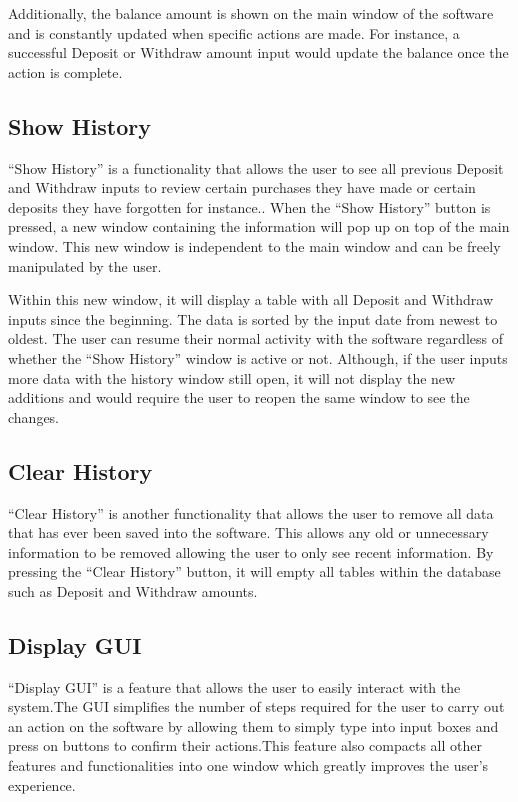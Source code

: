 \documentclass[12pt]{article}
\begin{document}
Additionally, the balance amount is shown on the main window of the software and is constantly updated when specific actions are made. For instance, a successful Deposit or Withdraw amount input would update the balance once the action is complete. 


\subsection{Show History} 
“Show History” is a functionality that allows the user to see all previous Deposit and Withdraw inputs to review certain purchases they have made or certain deposits they have forgotten for instance.. When the “Show History” button is pressed, a new window containing the information will pop up on top of the main window. This new window is independent to the main window and can be freely manipulated by the user. 

Within this new window, it will display a table with all Deposit and Withdraw inputs since the beginning. The data is sorted by the input date from newest to oldest. The user can resume their normal activity with the software regardless of whether the “Show History” window is active or not. Although, if the user inputs more data with the history window still open, it will not display the new additions and would require the user to reopen the same window to see the changes.


\subsection{Clear History}
“Clear History” is another functionality that allows the user to remove all data that has ever been saved into the software. This allows any old or unnecessary information to be removed allowing the user to only see recent information. By pressing the “Clear History” button, it will empty all tables within the database such as Deposit and Withdraw amounts.

\subsection{Display GUI}
“Display GUI” is a feature that allows the user to easily interact with the system.The GUI simplifies the number of steps required for the user to carry out an action on the software by allowing them to simply type into input boxes and press on buttons to confirm their actions.This feature also compacts all other features and functionalities into one window which greatly improves the user’s experience. 
\end{document}
